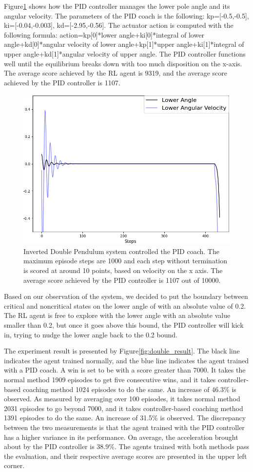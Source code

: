 \documentclass[journal]{IEEEtran}
\begin{document}
Figure\ref{fig:double} shows how the PID controller manages the lower pole angle and its angular velocity. The parameters of the PID coach is the following: kp=[-0.5,-0.5], ki=[-0.04,-0.003], kd=[-2.95,-0.56]. The actuator action is computed with the following formula: action=kp[0]*lower angle+ki[0]*integral of lower angle+kd[0]*angular velocity of lower angle+kp[1]*upper angle+ki[1]*integral of upper angle+kd[1]*angular velocity of upper angle. The PID controller functions well until the equilibrium breaks down with too much disposition on the x-axis. The average score achieved by the RL agent is 9319, and the average score achieved by the PID controller is 1107.
\begin{figure}[H]
\centering
  \centering
  \includegraphics[width=0.5\linewidth]{double_PID.png}
\caption{Inverted Double Pendulum system controlled the PID coach. The maximum episode steps are 1000 and each step without termination is scored at around 10 points, based on velocity on the x axis. The average score achieved by the PID controller is 1107 out of 10000. }
\label{fig:double}
\end{figure}

Based on our observation of the system, we decided to put the boundary between critical and noncritical states on the lower angle of with an absolute value of 0.2. The RL agent is free to explore with the lower angle with an absolute value smaller than 0.2, but once it goes above this bound, the PID controller will kick in, trying to nudge the lower angle back to the 0.2 bound.

The experiment result is presented by Figure\ref{fig:double_result}. The black line indicates the agent trained normally, and the blue line indicates the agent trained with a PID coach. A win is set to be with a score greater than 7000. It takes the normal method 1909 episodes to get five consecutive wins, and it takes controller-based coaching method 1024 episodes to do the same. An increase of 46.3\% is observed. As measured by averaging over 100 episodes, it takes normal method 2031 episodes to go beyond 7000, and it takes controller-based coaching method 1391 episodes to do the same. An increase of 31.5\% is observed. The discrepancy between the two measurements is that the agent trained with the PID controller has a higher variance in its performance. On average, the acceleration brought about by the PID controller is 38.9\%. The agents trained with both methods pass the evaluation, and their respective average scores are presented in the upper left corner.
\end{document}

